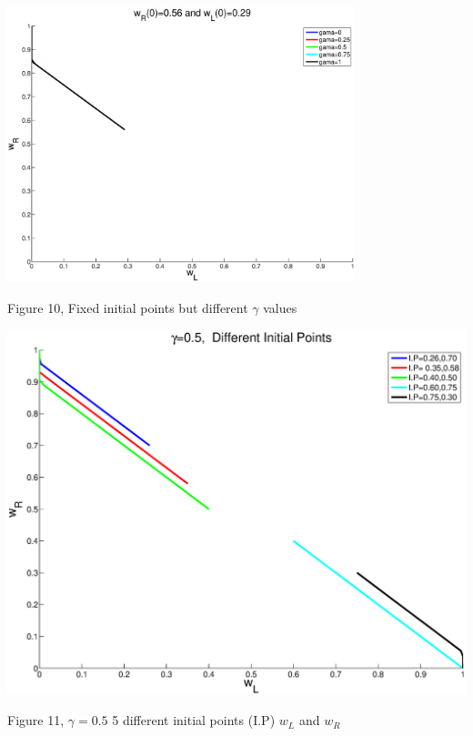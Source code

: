 \documentclass{article}
\begin{document}
\begin{center}
\includegraphics[width=\textwidth, height=80mm]{norm_init.eps}
\begin{footnotesize}
 Figure 10,  Fixed initial points but different $\gamma$ values
\end{footnotesize}
\end{center}

\begin{center}
\includegraphics[width=\textwidth]{norm_init1.eps}
\begin{footnotesize}
 Figure 11, $\gamma=0.5$ 5 different initial points (I.P)  $w_L$ and $w_R$
\end{footnotesize}
\end{center}
\end{document}
